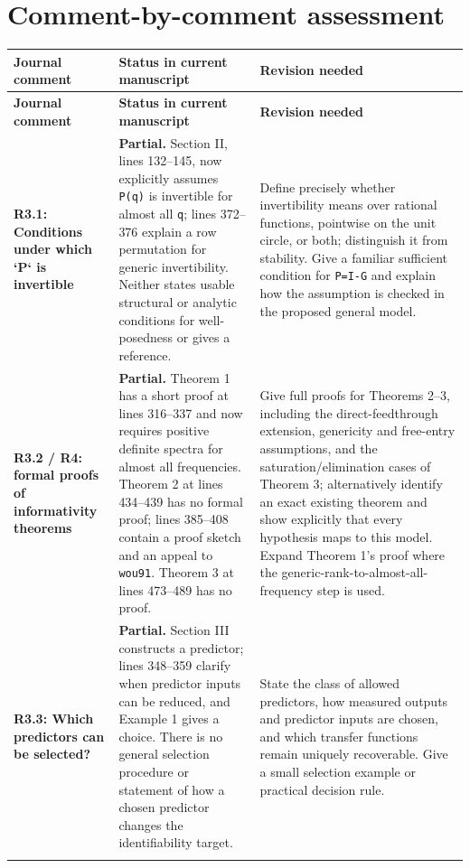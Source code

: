 \documentclass[11pt,a4paper]{article}
\begin{document}
\section{Comment-by-comment assessment}
\small
\begin{longtable}{@{}p{}p{}p{}@{}}
\toprule
\textbf{Journal comment} & \textbf{Status in current manuscript} & \textbf{Revision needed}\\
\midrule
\endfirsthead
\toprule
\textbf{Journal comment} & \textbf{Status in current manuscript} & \textbf{Revision needed}\\
\midrule
\endhead
\textbf{R3.1: Conditions under which `P` is invertible} & \textbf{Partial.} Section II, lines 132–145, now explicitly assumes \texttt{P(q)} is invertible for almost all \texttt{q}; lines 372–376 explain a row permutation for generic invertibility. Neither states usable structural or analytic conditions for well-posedness or gives a reference. & Define precisely whether invertibility means over rational functions, pointwise on the unit circle, or both; distinguish it from stability. Give a familiar sufficient condition for \texttt{P=I-G} and explain how the assumption is checked in the proposed general model.\\\addlinespace\midrule
\textbf{R3.2 / R4: formal proofs of informativity theorems} & \textbf{Partial.} Theorem 1 has a short proof at lines 316–337 and now requires positive definite spectra for almost all frequencies. Theorem 2 at lines 434–439 has no formal proof; lines 385–408 contain a proof sketch and an appeal to \texttt{wou91}. Theorem 3 at lines 473–489 has no proof. & Give full proofs for Theorems 2–3, including the direct-feedthrough extension, genericity and free-entry assumptions, and the saturation/elimination cases of Theorem 3; alternatively identify an exact existing theorem and show explicitly that every hypothesis maps to this model. Expand Theorem 1's proof where the generic-rank-to-almost-all-frequency step is used.\\\addlinespace\midrule
\textbf{R3.3: Which predictors can be selected?} & \textbf{Partial.} Section III constructs a predictor; lines 348–359 clarify when predictor inputs can be reduced, and Example 1 gives a choice. There is no general selection procedure or statement of how a chosen predictor changes the identifiability target. & State the class of allowed predictors, how measured outputs and predictor inputs are chosen, and which transfer functions remain uniquely recoverable. Give a small selection example or practical decision rule.\\\addlinespace\midrule

\end{longtable}
\end{document}
